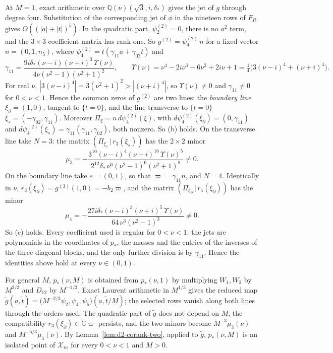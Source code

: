 \documentclass[Threeside,11pt]{article}
\theoremstyle{definition}
\theoremstyle{remark}
\numberwithin{equation}{section}
\newcommand{\C}{\mathbb C}\newcommand{\T}{\mathbb T}
\theoremstyle{remark}
\begin{document}
At $M=1$, exact arithmetic over $\mathbb Q(\nu)(\sqrt3,i,\delta_*)$ gives the
jet of $g$ through degree four. Substitution of the corresponding jet of $\phi$
in the nineteen rows of $F_R$ gives $O((|a|+|t|)^5)$.  In the quadratic part, $\psi_2^{(2)}=0$, there is no $a^2$ term,
and the $3\times3$ coefficient matrix has rank one.  So $g^{(2)}=\psi_4^{(2)}\,n$ for a fixed
vector $n=(0,1,n_5)$, where $\psi_4^{(2)}=t(\gamma_{11}a+\gamma_{02}t)$ and
\[
  \gamma_{11}=\frac{9i\delta_*(\nu-i)(\nu+i)^3\,\Upsilon(\nu)}{4\nu(\nu^2-1)(\nu^2+1)^2},\qquad
  \Upsilon(\nu)=\nu^4-2i\nu^3-6\nu^2+2i\nu+1=\tfrac14\bigl(3(\nu-i)^4+(\nu+i)^4\bigr).
\]
For real $\nu$, $|3(\nu-i)^4|=3(\nu^2+1)^2>|(\nu+i)^4|$, so $\Upsilon(\nu)\ne0$ and
$\gamma_{11}\ne0$ for $0<\nu<1$.  Hence the common zeros of $g^{(2)}$ are two lines: the
\emph{boundary line} $\xi_\partial=(1,0)$, tangent to $\{t=0\}$, and the line transverse to $\{t=0\}$
$\xi_s=(-\gamma_{02},\gamma_{11})$.  Moreover $\Pi_\xi=n\,d\psi_4^{(2)}(\xi)$, with
$d\psi_4^{(2)}(\xi_\partial)=(0,\gamma_{11})$ and
$d\psi_4^{(2)}(\xi_s)=\gamma_{11}(\gamma_{11},\gamma_{02})$, both nonzero.  So (b) holds.
On the transverse line take $N=3$: the matrix $(\Pi_{\xi_s}\,|\,r_3(\xi_s))$ has the $2\times2$
minor
\[
  \mu_3=-\frac{3^{10}(\nu-i)^4(\nu+i)^{16}\,\Upsilon(\nu)^5}
             {2^{12}\delta_*\,\nu^6(\nu^2-1)^6(\nu^2+1)^8}\ne0 .
\]
On the boundary line take $e=(0,1)$, so that $\varpi=\gamma_{11}n$, and $N=4$.  Identically in
$\nu$, $r_3(\xi_\partial)=g^{(3)}(1,0)=-b_2\varpi$, and the matrix
$(\Pi_{\xi_\partial}\,|\,r_4(\xi_\partial))$ has the minor
\[
  \mu_4=-\frac{27i\delta_*(\nu-i)^3(\nu+i)^5\,\Upsilon(\nu)}{64\,\nu^3(\nu^2-1)^3}\ne0 .
\]
So (c) holds.  Every coefficient used is regular for $0<\nu<1$: the jets are polynomials in the
coordinates of $p_*$, the masses and the entries of the inverses of the three diagonal blocks,
and the only further division is by $\gamma_{11}$.  Hence the identities above hold at every
$\nu\in(0,1)$.

For general $M$, $p_*(\nu,M)$ is obtained from $p_*(\nu,1)$ by multiplying $W_1,W_2$ by $M^{2/3}$
and $D_{12}$ by $M^{-1/3}$.  Exact Laurent arithmetic in $M^{1/3}$ gives the reduced map
$\tilde g(a,\tilde t)=\bigl(M^{-2/3}\psi_2,\psi_4,\psi_5\bigr)(a,\tilde t/M)$;
the selected rows vanish along both lines through the orders used.  The quadratic part of $\tilde g$ does not depend on $M$, the compatibility
$r_3(\xi_\partial)\in\C\varpi$ persists, and the two minors become $M^{-3}\mu_3(\nu)$ and
$M^{-5/3}\mu_4(\nu)$.  By Lemma~\ref{lem:d2-corank-two}, applied to $\tilde g$, $p_*(\nu,M)$ is
an isolated point of $\mathcal X_m$ for every $0<\nu<1$ and $M>0$.
\end{document}
